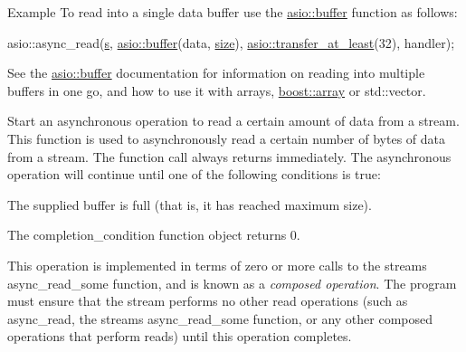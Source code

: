 \begin{DoxyParagraph}{Example}
To read into a single data buffer use the \hyperlink{group__buffer}{asio\+::buffer} function as follows\+: 
\begin{DoxyCode}
asio::async\_read(\hyperlink{group__async__connect_ga31ab74b9ea6c77932dddd016cfc7920a}{s},
   \hyperlink{group__buffer_ga1ed66e401559cbfd19595392f653b47c}{asio::buffer}(data, \hyperlink{namespaceuva_1_1utils_1_1containers_aea6a0a858974dd7edb4227dcbcbc1eb6a0be5bdf7cf8c7c58d0bc5678caa07791}{size}),
   \hyperlink{group__completion__condition_ga2b10af704afcd6c7ed7f0d3b740033ef}{asio::transfer\_at\_least}(32),
   handler); 
\end{DoxyCode}
 See the \hyperlink{group__buffer}{asio\+::buffer} documentation for information on reading into multiple buffers in one go, and how to use it with arrays, \hyperlink{classboost_1_1array}{boost\+::array} or std\+::vector.
\end{DoxyParagraph}
Start an asynchronous operation to read a certain amount of data from a stream. This function is used to asynchronously read a certain number of bytes of data from a stream. The function call always returns immediately. The asynchronous operation will continue until one of the following conditions is true\+:

\begin{DoxyItemize}
\item The supplied buffer is full (that is, it has reached maximum size).\end{DoxyItemize}
\begin{DoxyItemize}
\item The completion\+\_\+condition function object returns 0.\end{DoxyItemize}
This operation is implemented in terms of zero or more calls to the stream\textquotesingle{}s async\+\_\+read\+\_\+some function, and is known as a {\itshape composed operation}. The program must ensure that the stream performs no other read operations (such as async\+\_\+read, the stream\textquotesingle{}s async\+\_\+read\+\_\+some function, or any other composed operations that perform reads) until this operation completes.


